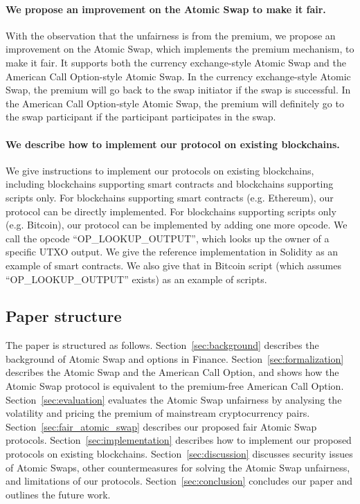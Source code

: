 \paragraph{We propose an improvement on the Atomic Swap to make it fair.}
With the observation that the unfairness is from the premium,
we propose an improvement on the Atomic Swap, which implements the premium mechanism, to make it fair.
It supports both the currency exchange-style Atomic Swap and the American Call Option-style Atomic Swap.
In the currency exchange-style Atomic Swap, the premium will go back to the swap initiator if the swap is successful.
In the American Call Option-style Atomic Swap, the premium will definitely go to the swap participant if the participant participates in the swap.

\paragraph{We describe how to implement our protocol on existing blockchains.}
We give instructions to implement our protocols on existing blockchains,
including blockchains supporting smart contracts and blockchains supporting scripts only.
For blockchains supporting smart contracts (e.g. Ethereum), our protocol can be directly implemented.
For blockchains supporting scripts only (e.g. Bitcoin), our protocol can be implemented by adding one more opcode.
We call the opcode ``OP\_LOOKUP\_OUTPUT'', which looks up the owner of a specific UTXO output.
We give the reference implementation in Solidity as an example of smart contracts.
We also give that in Bitcoin script (which assumes ``OP\_LOOKUP\_OUTPUT'' exists) as an example of scripts.










\subsection{Paper structure}

The paper is structured as follows.
Section~\ref{sec:background} describes the background of Atomic Swap and options in Finance.
Section~\ref{sec:formalization} describes the Atomic Swap and the American Call Option, and shows how the Atomic Swap protocol is equivalent to the premium-free American Call Option.
Section~\ref{sec:evaluation} evaluates the Atomic Swap unfairness by analysing the volatility and pricing the premium of mainstream cryptocurrency pairs.
Section~\ref{sec:fair_atomic_swap} describes our proposed fair Atomic Swap protocols.
Section~\ref{sec:implementation} describes how to implement our proposed protocols on existing blockchains.
Section~\ref{sec:discussion} discusses security issues of Atomic Swaps, other countermeasures for solving the Atomic Swap unfairness, and limitations of our protocols.
Section~\ref{sec:conclusion} concludes our paper and outlines the future work.
